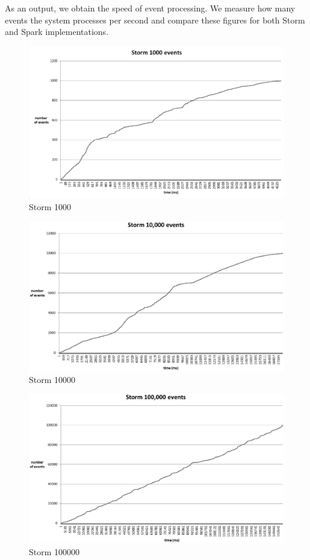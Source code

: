 As an output, we obtain the speed of event processing.
We measure how many events the system processes per second and compare these figures for both Storm and Spark implementations. 

\begin{figure}
  \centering
  \includegraphics [width=1.0\textwidth]{images/storm1000}
  \caption{Storm 1000}
  \label{fig:storm1000}
\end{figure}

\begin{figure}
  \centering
  \includegraphics [width=1.0\textwidth]{images/storm10000}
  \caption{Storm 10000}
  \label{fig:storm10000}
\end{figure}

\begin{figure}
  \centering
  \includegraphics [width=1.0\textwidth]{images/storm100000}
  \caption{Storm 100000}
  \label{fig:storm100000}
\end{figure}

